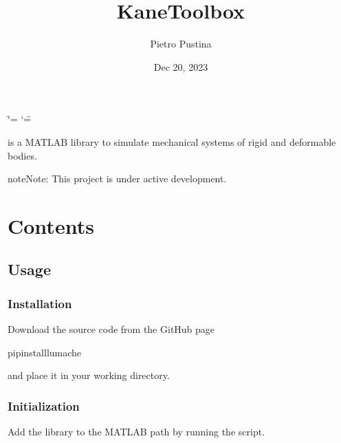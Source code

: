 \documentclass[letterpaper,10pt,english]{sphinxmanual}
\title{KaneToolbox}
\date{Dec 20, 2023}
\author{Pietro Pustina}
\begin{document}
\ifdefined\shorthandoff
  \ifnum\catcode`\=\string=\active\shorthandoff{=}\fi
  \ifnum\catcode`\"=\active{}\fi
\fi

\pagestyle{empty}
\sphinxmaketitle
\pagestyle{plain}
\sphinxtableofcontents
\pagestyle{normal}
\label{\detokenize{index::doc}}


\sphinxAtStartPar
{} is a MATLAB library to simulate mechanical systems of rigid and deformable bodies.

\begin{sphinxadmonition}{note}{Note:}
\sphinxAtStartPar
This project is under active development.
\end{sphinxadmonition}


\chapter{Contents}
\label{\detokenize{index:contents}}
\sphinxstepscope


\section{Usage}
\label{\detokenize{usage:usage}}\label{\detokenize{usage::doc}}

\subsection{Installation}
\label{\detokenize{usage:installation}}\label{\detokenize{usage:id1}}
\sphinxAtStartPar
Download the source code from the GitHub page

\begin{sphinxVerbatim}[commandchars=\\\{\}]
 pipinstalllumache
\end{sphinxVerbatim}

\sphinxAtStartPar
and place it in your working directory.


\subsection{Initialization}
\label{\detokenize{usage:initialization}}
\sphinxAtStartPar
Add the library to the MATLAB path by running the  script.

\begin{sphinxVerbatim}[commandchars=\\\{\}]
\end{sphinxVerbatim}
\end{document}
